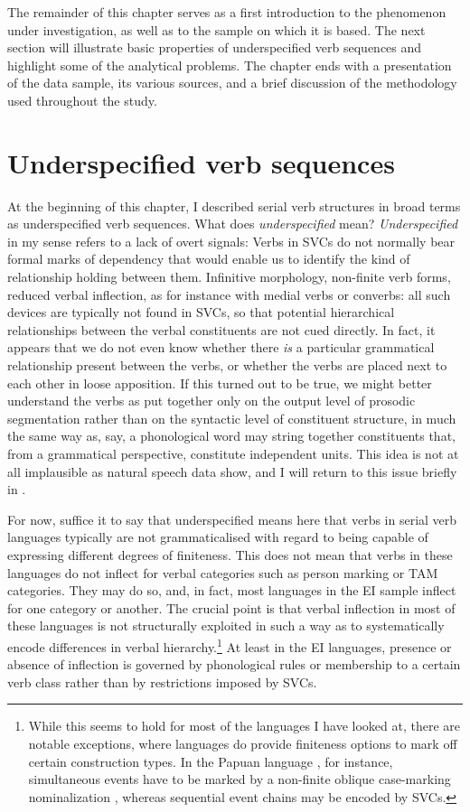 The remainder of this chapter serves as a first introduction to the phenomenon under investigation, as well as to the sample on which it is based. The next section will illustrate basic properties of underspecified verb sequences and highlight some of the analytical problems. The chapter ends with a presentation of the data sample, its various sources, and a brief discussion of the methodology used throughout the study.

\section{Underspecified verb sequences}\label{underspecified}

At the beginning of this chapter, I described serial verb structures in broad terms as underspecified verb sequences. What does \textit{underspecified} mean? \textit{Underspecified} in my sense refers to a lack of overt signals: Verbs in SVCs do not normally bear formal marks of dependency that would enable us to identify the kind of relationship holding between them. Infinitive morphology, non-finite verb forms, reduced verbal inflection, as for instance with medial verbs or converbs: all such devices are typically not found in SVCs, so that potential hierarchical relationships between the verbal constituents are not cued directly. In fact, it appears that we do not even know whether there \emph{is} a particular grammatical relationship present between the verbs, or whether the verbs are placed next to each other in loose apposition. If this turned out to be true, we might better understand the verbs as put together only on the output level of prosodic segmentation rather than on the syntactic level of constituent structure, in much the same way as, say, a phonological word may string together constituents that, from a grammatical perspective, constitute independent units. This idea is not at all implausible as natural speech data show, and I will return to this issue briefly in . 

For now, suffice it to say that underspecified means here that verbs in serial verb languages typically are not grammaticalised with regard to being capable of expressing different degrees of finiteness. This does not mean that verbs in these languages do not inflect for verbal categories such as person marking or TAM categories. They may do so, and, in fact, most languages in the EI sample inflect for one category or another. The crucial point is that verbal inflection in most of these languages is not structurally exploited in such a way as to systematically encode differences in verbal hierarchy.\footnote{While this seems to hold for most of the languages I have looked at, there are notable exceptions, where languages do provide finiteness options to mark off certain construction types. In the Papuan language , for instance, simultaneous events have to be marked by a non-finite oblique case-marking nominalization \citep[142]{foley2008}, whereas sequential event chains may be encoded by SVCs.} At least in the EI languages, presence or absence of inflection is governed by phonological rules or membership to a certain verb class rather than by restrictions imposed by SVCs.

